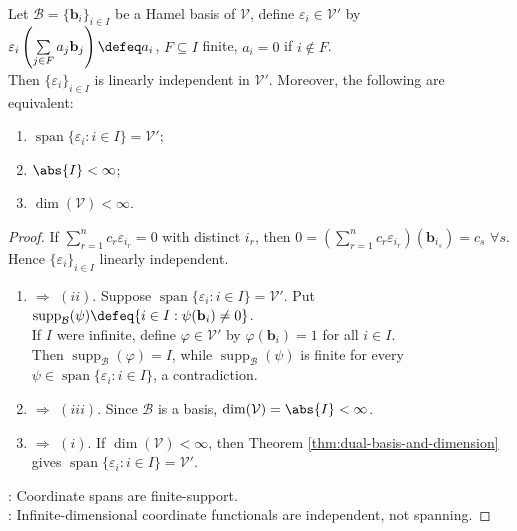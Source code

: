 \begin{proposition} \label{prop:coordinate-functionals-for-hamel-basis} \\
Let $\mathcal{B}=\{\mathbf{b}_i\}_{i\in I}$ be a Hamel basis of $\mathcal{V}$, define $\varepsilon_i\in\mathcal{V}'$ by $\varepsilon_i\left(\sum\limits_{j\in F}a_j\mathbf{b}_j\right)\defeq a_i$, $F\subseteq I$ finite, $a_i=0$ if $i\notin F$.\\
Then $\{\varepsilon_i\}_{i\in I}$ is linearly independent in $\mathcal{V}'$. Moreover, the following are equivalent:
\begin{enumerate}[label=(\roman*)]
\setlength{\itemsep}{0pt}
\item $\operatorname{span}\{\varepsilon_i:i\in I\}=\mathcal{V}'$;
\item $\abs{I}<\infty$;
\item $\dim(\mathcal{V})<\infty$.
\end{enumerate}
\begin{proof}
If $\sum\limits_{r=1}^n c_r\varepsilon_{i_r}=0$ with distinct $i_r$, then $0=\left(\sum\limits_{r=1}^n c_r\varepsilon_{i_r}\right)(\mathbf{b}_{i_s})=c_s$ $\forall s$. Hence $\{\varepsilon_i\}_{i\in I}$ linearly independent.
\begin{enumerate}[label=(\roman*).]
\setlength{\itemsep}{0pt}
\item[$(i)$] $\Rightarrow$ $(ii)$. Suppose $\operatorname{span}\{\varepsilon_i:i\in I\}=\mathcal{V}'$. Put $\operatorname{supp}_{\mathcal{B}}(\psi)\defeq\{i\in I:\psi(\mathbf{b}_i)\neq0\}$.\\
If $I$ were infinite, define $\varphi\in\mathcal{V}'$ by $\varphi(\mathbf{b}_i)=1$ for all $i\in I$.\\
Then $\operatorname{supp}_{\mathcal{B}}(\varphi)=I$, while $\operatorname{supp}_{\mathcal{B}}(\psi)$ is finite for every $\psi\in\operatorname{span}\{\varepsilon_i:i\in I\}$, a contradiction.
\item[$(ii)$] $\Rightarrow$ $(iii)$. Since $\mathcal{B}$ is a basis, $\dim(\mathcal{V})=\abs{I}<\infty$.
\item[$(iii)$] $\Rightarrow$ $(i)$. If $\dim(\mathcal{V})<\infty$, then Theorem \ref{thm:dual-basis-and-dimension} gives $\operatorname{span}\{\varepsilon_i:i\in I\}=\mathcal{V}'$.
\end{enumerate}
: Coordinate spans are finite-support.\\
: Infinite-dimensional coordinate functionals are independent, not spanning.
\end{proof}
\end{proposition}


